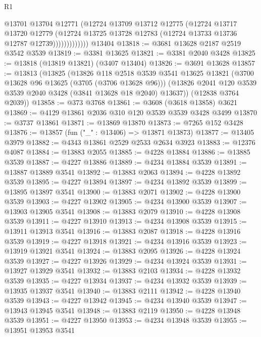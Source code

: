 \begin{lexlean}{R1}
\begin{coremodule}
                      @13701
                      @13704
                      @12771
                      (@12724
                        @13709
                        @13712
                        @12775
                        (@12724
                          @13717
                          @13720
                          @12779
                          (@12724
                            @13725
                            @13728
                            @12783
                            (@12724 @13733 @13736 @12787 @12739)))))))))))))
    @13404
@13818 := @3681 @13628 @2187 @2519 @3542 @3539
@13819 := @3381 @13625
@13821 := @3381 @2040 @3428
@13825 := @13818 (@13819 @13821) (@3407 @13404)
@13826 := @3691 @13628
@13857 := @13813
    (@13825
      (@13826
        @118
        @2518
        @3539
        @3541
        @13625
        @13821
        (@3700 @13628 @96 @13625 (@3705 (@3706 @13628 @96)))
        (@13826 @2041 @120 @3539 @3539 @2040 @3428 (@3841 @13628 @18 @2040) @13637))
      (@12838 @3764 @2039))
@13858 := @373 @3768
@13861 := @3608 (@3618 @13858) @3621
@13869 := @4129 @13861 @2036 @310 @120 @3539 @3539 @3428 @3499
@13870 := @3737 @13861
@13871 := @13869 @13870
@13873 := @7265 @152 @3428
@13876 := @13857 (fun ("_" : @13406) => @13871 @13873)
@13877 := @13405 @3979
@13882 := @4343 @13861 @2529 @2533 @2634 @3923
@13883 := @12376 @4087
@13884 := @13883 @2055
@13885 := @4228 @13884
@13886 := @13885 @3539
@13887 := @4227 @13886
@13889 := @4234 @13884 @3539
@13891 := @13887 @13889 @3541
@13892 := @13883 @2063
@13894 := @4228 @13892 @3539
@13895 := @4227 @13894
@13897 := @4234 @13892 @3539
@13899 := @13895 @13897 @3541
@13900 := @13883 @2071
@13902 := @4228 @13900 @3539
@13903 := @4227 @13902
@13905 := @4234 @13900 @3539
@13907 := @13903 @13905 @3541
@13908 := @13883 @2079
@13910 := @4228 @13908 @3539
@13911 := @4227 @13910
@13913 := @4234 @13908 @3539
@13915 := @13911 @13913 @3541
@13916 := @13883 @2087
@13918 := @4228 @13916 @3539
@13919 := @4227 @13918
@13921 := @4234 @13916 @3539
@13923 := @13919 @13921 @3541
@13924 := @13883 @2095
@13926 := @4228 @13924 @3539
@13927 := @4227 @13926
@13929 := @4234 @13924 @3539
@13931 := @13927 @13929 @3541
@13932 := @13883 @2103
@13934 := @4228 @13932 @3539
@13935 := @4227 @13934
@13937 := @4234 @13932 @3539
@13939 := @13935 @13937 @3541
@13940 := @13883 @2111
@13942 := @4228 @13940 @3539
@13943 := @4227 @13942
@13945 := @4234 @13940 @3539
@13947 := @13943 @13945 @3541
@13948 := @13883 @2119
@13950 := @4228 @13948 @3539
@13951 := @4227 @13950
@13953 := @4234 @13948 @3539
@13955 := @13951 @13953 @3541

\end{coremodule}
\end{lexlean}
